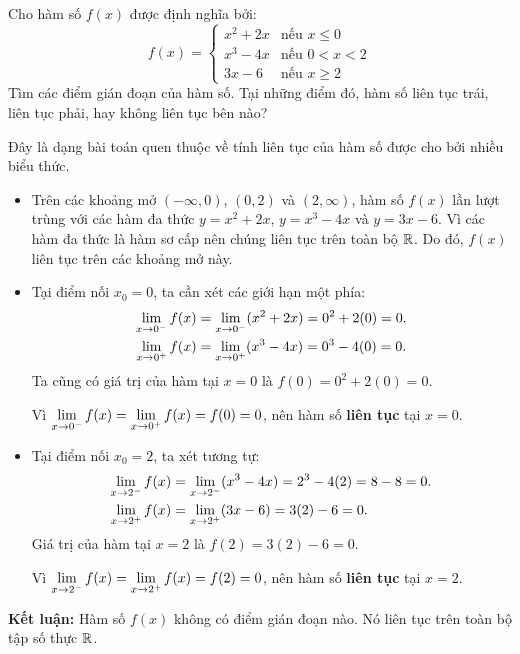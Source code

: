 \begin{example}
	Cho hàm số \( f(x) \) được định nghĩa bởi:
	\[
		f(x) = \begin{cases}
			x^2 + 2x & \text{nếu } x \le 0 \\
			x^3 - 4x & \text{nếu } 0 < x < 2 \\
			3x - 6   & \text{nếu } x \ge 2
		\end{cases}
	\]
	Tìm các điểm gián đoạn của hàm số. Tại những điểm đó, hàm số liên tục trái, liên tục phải, hay không liên tục bên nào?
	\begin{solution}
		Đây là dạng bài toán quen thuộc về tính liên tục của hàm số được cho bởi nhiều biểu thức.
		
		\begin{itemize}
			\item Trên các khoảng mở \( (-\infty, 0) \), \( (0, 2) \) và \( (2, \infty) \), hàm số \( f(x) \) lần lượt trùng với các hàm đa thức \( y = x^2 + 2x \), \( y = x^3 - 4x \) và \( y = 3x - 6 \). Vì các hàm đa thức là hàm sơ cấp nên chúng liên tục trên toàn bộ \( \mathbb{R} \). Do đó, \( f(x) \) liên tục trên các khoảng mở này.
			
			\item Tại điểm nối \( x_0 = 0 \), ta cần xét các giới hạn một phía:
			      \begin{align*}
				      \lim\limits_{x \to 0^-} f(x) &= \lim\limits_{x \to 0^-} (x^2 + 2x) = 0^2 + 2(0) = 0. \\
				      \lim\limits_{x \to 0^+} f(x) &= \lim\limits_{x \to 0^+} (x^3 - 4x) = 0^3 - 4(0) = 0.
			      \end{align*}
			      Ta cũng có giá trị của hàm tại \( x=0 \) là \( f(0) = 0^2 + 2(0) = 0 \).
			      
			      Vì \( \lim\limits_{x \to 0^-} f(x) = \lim\limits_{x \to 0^+} f(x) = f(0) = 0 \), nên hàm số \textbf{liên tục} tại \( x=0 \).
			
			\item Tại điểm nối \( x_0 = 2 \), ta xét tương tự:
			      \begin{align*}
				      \lim\limits_{x \to 2^-} f(x) &= \lim\limits_{x \to 2^-} (x^3 - 4x) = 2^3 - 4(2) = 8 - 8 = 0. \\
				      \lim\limits_{x \to 2^+} f(x) &= \lim\limits_{x \to 2^+} (3x - 6) = 3(2) - 6 = 0.
			      \end{align*}
			      Giá trị của hàm tại \( x=2 \) là \( f(2) = 3(2) - 6 = 0 \).
			      
			      Vì \( \lim\limits_{x \to 2^-} f(x) = \lim\limits_{x \to 2^+} f(x) = f(2) = 0 \), nên hàm số \textbf{liên tục} tại \( x=2 \).
		\end{itemize}
		
		\textbf{Kết luận:} Hàm số \( f(x) \) không có điểm gián đoạn nào. Nó liên tục trên toàn bộ tập số thực \( \mathbb{R} \).
	\end{solution}
\end{example}

